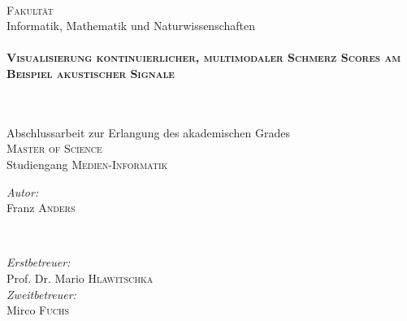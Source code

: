 \begin{titlepage}
\begin{minipage}{0.48\textwidth}
\end{minipage}\\[1.5cm]





\large \textsc{Fakultät} \\ Informatik, Mathematik und Naturwissenschaften\\[1cm] %


\HRule \\[0.4cm]
{ \huge \bfseries \textsc{Visualisierung kontinuierlicher, multimodaler Schmerz Scores am \\[0.3cm] Beispiel akustischer Signale}}
\subtitle{Masterarbeit}\\[0.2cm] %
\HRule \\[1cm]
 
\large Abschlussarbeit zur Erlangung des akademischen Grades \\ 
\textsc{Master of Science}\\[3cm]

\large Studiengang \textsc{Medien-Informatik}\\[1.5cm]


\begin{minipage}{0.4\textwidth}
\begin{flushleft} \large
\emph{Autor:}\\
Franz \textsc{Anders} %
\end{flushleft}
\end{minipage}
~
\begin{minipage}{0.4\textwidth}
\begin{flushright} \large
\emph{Erstbetreuer:} \\
Prof. Dr. Mario \textsc{Hlawitschka} %
\\[0.5cm]
\emph{Zweitbetreuer:} \\
Mirco \textsc{Fuchs}
\end{flushright}
\end{minipage}\\[1.5cm]


\end{titlepage}

